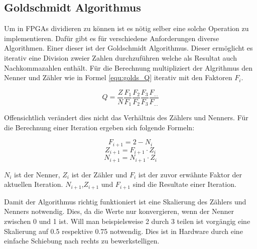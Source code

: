 
\subsection{Goldschmidt Algorithmus}\label{subsec:Goldschmidt}

Um in FPGAs dividieren zu können ist es nötig selber eine solche Operation zu implementieren. Dafür gibt es für verschiedene Anforderungen diverse Algorithmen. Einer dieser ist der Goldschmidt Algorithmus. Dieser ermöglicht es iterativ eine Division zweier Zahlen durchzuführen welche als Resultat auch Nachkommazahlen enthält. Für die Berechnung multipliziert der Algrithmus den Nenner und Zähler wie in Formel \ref{equ:golds_Q} iterativ mit den Faktoren \(F_i\).

\begin{equation}
Q = \frac{Z}{N}\frac{F_1}{F_1}\frac{F_2}{F_2}\frac{F_3}{F_3}\frac{F_{...}}{F_{...}}
\label{equ:golds_Q}
\end{equation}

Offensichtlich verändert dies nicht das Verhältnis des Zählers und Nenners. Für die Berechnung einer Iteration ergeben sich folgende Formeln:

\begin{equation}
F_{i+1} = 2 - N_i
\label{equ:golds_Fi+1}
\end{equation}
\begin{equation}
Z_{i+1} = F_{i+1}\cdot Z_i
\label{equ:golds_Zi+1}
\end{equation}
\begin{equation}
N_{i+1} = N_{i+1}\cdot Z_i
\label{equ:golds_Ni+1}
\end{equation}

\(N_i\) ist der Nenner, \(Z_i\) ist der Zähler und \(F_i\) ist der zuvor erwähnte Faktor der aktuellen Iteration. \(N_{i+1}\),\(Z_{i+1}\) und \(F_{i+1}\) sind die Resultate einer Iteration.

Damit der Algorithmus richtig funktioniert ist eine Skalierung des Zählers und Nenners notwendig. Dies, da die Werte nur konvergieren, wenn der Nenner zwischen 0 und 1 ist. Will man beispielsweise 2 durch 3 teilen ist vorgängig eine Skalierung auf 0.5 respektive 0.75 notwendig. Dies ist in Hardware durch eine einfache Schiebung nach rechts zu bewerkstelligen.